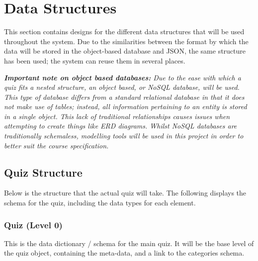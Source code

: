 \section{Data Structures}
This section contains designs for the different data structures that will be used throughout the system. Due to the similarities between the format by which the data will be stored in the object-based database and JSON, the same structure has been used; the system can reuse them in several places.

\textit{\textbf{Important note on object based databases:} Due to the ease with which a quiz fits a nested structure, an object based, or NoSQL database, will be used. This type of database differs from a standard relational database in that it does not make use of tables; instead, all information pertaining to an entity is stored in a single object. This lack of traditional relationships causes issues when attempting to create things like ERD diagrams. Whilst NoSQL databases are traditionally schemaless, modelling tools will be used in this project in order to better suit the course specification. }

\subsection{Quiz Structure}
Below is the structure that the actual quiz will take. The following displays the schema for the quiz, including the data types for each element.

\subsubsection{Quiz (Level 0)}
This is the data dictionary / schema for the main quiz. It will be the base level of the quiz object, containing the meta-data, and a link to the categories schema.

